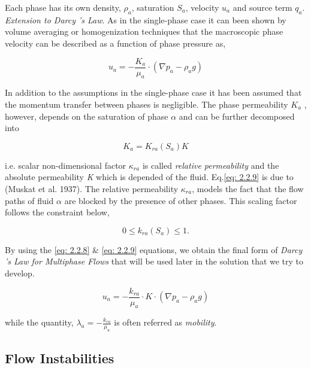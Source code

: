 \documentclass[12pt,a4paper,oneside]{report}%
\begin{document}
\noindent Each phase has its own density, $\rho_a$, saturation $S_a$, velocity $u_a$ and source term $q_a$.
\textit{Extension to Darcy 's Law}. As in the single-phase case it can been shown by volume averaging or homogenization techniques that the macroscopic phase velocity can be described as a function of phase pressure as,

\begin{equation}
u_a = - \frac{K_a}{\mu_a} \cdot (\nabla p_a - \rho_a g)
\label{eq: Darcy's law}
\end{equation}  

In addition to the assumptions in the single-phase case it has been assumed that the momentum transfer between phases is negligible. The phase permeability $K_a$ , however, depends on the saturation of phase $\alpha$ and can be further decomposed into

\begin{equation}
K_a= K_{ra} (S_a) K
\label{eq: 2.2.12}
\end{equation}

\noindent i.e. scalar non-dimensional factor $\kappa_{ra}$ is called \textit{relative permeability} and the absolute permeability \textit{K} which is depended of the fluid. Eq.\ref{eq: 2.2.9} is due to (Muskat et al. 1937). The relative permeability $\kappa_{ra}$, models the fact that the flow paths of fluid $\alpha$ are blocked by the presence of other phases. This scaling factor follows the constraint below,

\begin{equation}
0 \le k_{ra} (S_a) \le 1.
\label{eq: 2.2.13}
\end{equation} 

By using the \ref{eq: 2.2.8} \& \ref{eq: 2.2.9} equations, we obtain the final form of \textit{Darcy 's Law for Multiphase Flows} that will be used later in the solution that we try to develop.

\begin{equation}
u_a = - \frac{k_{ra}}{\mu_a} \cdot K \cdot (\nabla p_a - \rho_a g)
\label{eq: 2.2.14}
\end{equation}

\noindent while the quantity, $\lambda_a = - \frac{k_{ra}}{\mu_a} $ is often referred as \textit{mobility}.
 
 
\subsection{Flow Instabilities} 
\end{document}
